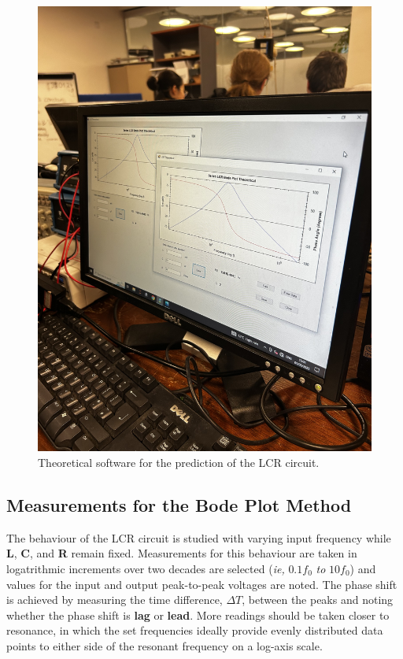 \documentclass[12pt]{article}
\begin{document}
\begin{figure}[H]
    \centering
    \includegraphics[width=15cm, angle=270]{own theo exp.jpeg}
    \caption{\centering \footnotesize{Theoretical software for the prediction of the LCR circuit.}}
    \label{fig:software}
\end{figure}

\subsection{Measurements for the Bode Plot Method} \label{sec:2.2}

The behaviour of the LCR circuit is studied with varying input frequency while \textbf{L}, \textbf{C}, and \textbf{R} remain fixed.
Measurements for this behaviour are taken in logatrithmic increments over two decades are selected (\textit{ie,} $0.1f_0$ \textit{to} $10f_0$) and values for the input and output peak-to-peak
voltages are noted.
The phase shift is achieved by measuring the time difference, $\Delta T$, between the peaks and noting whether the phase shift is \textbf{lag} or \textbf{lead}.
More readings should be taken closer to resonance, in which the set frequencies ideally provide evenly distributed data points to either side of the resonant frequency
on a log-axis scale.
\end{document}

